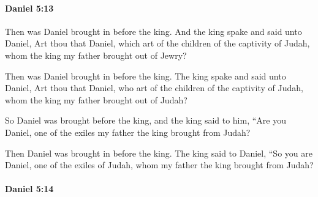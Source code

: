 		\paragraph{Daniel 5:13} %
			\label{DANIEL-5-13}

			Then was Daniel brought in before the king. And the king spake and said unto Daniel, Art thou that Daniel, which art of the children of the captivity of Judah, whom the king my father brought out of Jewry?

			\begin{versebox}
					\item[BHS] 
					\item[LXX] 
					\item[ASV] Then was Daniel brought in before the king. The king spake and said unto Daniel, Art thou that Daniel, who art of the children of the captivity of Judah, whom the king my father brought out of Judah?
					\item[NIV] So Daniel was brought before the king, and the king said to him, “Are you Daniel, one of the exiles my father the king brought from Judah?
					\item[NRSV] Then Daniel was brought in before the king. The king said to Daniel, “So you are Daniel, one of the exiles of Judah, whom my father the king brought from Judah?
			\end{versebox}

		\paragraph{Daniel 5:14} %
			\label{DANIEL-5-14}

